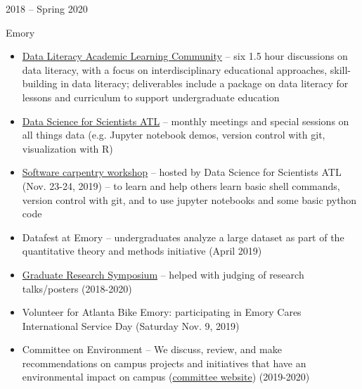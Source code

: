 \documentclass[a4paper,10pt]{article}
\newlength{\cvcolumngapwidth}
\newlength{\cvleftcolumnwidth}
\newlength{\cvrightcolumnwidth}
\newcommand{\cvtitlestyle}[1]{{\large\cvtitlefont\textcolor{cvtitlecolor}{#1}}}
\newcommand{\cvheadingstyle}[1]{{\normalsize\cvheadingfont\textcolor{cvheadingcolor}{#1}}}
\newlength{\cvafteritemskipamount}
\newlength{\cvaftertitleskipamount}
\newlength{\cvparskip}
\newcommand{\cvitem}[2]{
            \begin{minipage}[t]{\cvleftcolumnwidth}
                \raggedleft #1
            \end{minipage}%
            \hspace{\cvcolumngapwidth}%
            \begin{minipage}[t]{\cvrightcolumnwidth}
                \setlength{\parskip}{\cvparskip} #2
            \end{minipage}
        
            \vspace{\cvafteritemskipamount}
        }
\newcommand{\cvtitle}[1]{
            \cvtitlestyle{#1}
        
            \vspace{\cvaftertitleskipamount}
            \vspace{-\cvparskip}
        }
\begin{document}
                
        \cvitem{
            \cvheadingstyle{2018 -- Spring 2020}
        }{
            \cvtitle{Emory }
        
            \begin{itemize}[leftmargin=*]
            	\item \href{http://cfde.emory.edu/news-events/news/2019/november/data-literacy-alc.html}{Data Literacy Academic Learning Community} -- six 1.5 hour discussions on data literacy, with a focus on interdisciplinary educational approaches, skill-building in data literacy; deliverables include a package on data literacy for lessons and curriculum to support undergraduate education
        
        	\item \href{https://data-science-for-scientists-atl.github.io/}{Data Science for Scientists ATL} -- monthly meetings and special sessions on all things data (e.g. Jupyter notebook demos, version control with git, visualization with R)
        	
        	\item \href{https://data-science-for-scientists-atl.github.io/2019-11-23-emory/}{Software carpentry workshop}  -- hosted by Data Science for Scientists ATL (Nov. 23-24, 2019) -- to learn and help others learn basic shell commands, version control with git, and to use jupyter notebooks and some basic python code
        	
            	\item Datafest at Emory -- undergraduates analyze a large dataset as part of the quantitative theory and methods initiative (April 2019) 
        		
            	\item \href{http://biomed.emory.edu/news-events/events/dsac-research-symposium.html}{Graduate Research Symposium} -- helped with judging of research talks/posters (2018-2020) 	
        
        	\item Volunteer for Atlanta Bike Emory: participating in Emory Cares International Service Day (Saturday Nov. 9, 2019)
    	
    	    	\item Committee on Environment -- We discuss, review, and make recommendations on campus projects and initiatives that have an environmental impact on campus (\href{https://www.senate.emory.edu/about/committees/environment.html}{committee website}) (2019-2020)
        
            \end{itemize}
        
        }
        
\end{document}
